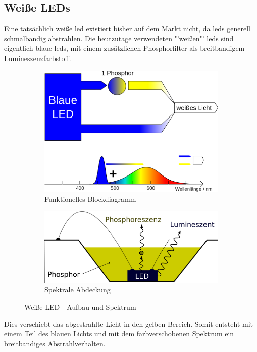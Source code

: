 \documentclass[11pt]{scrartcl}
\begin{document}
\subsection{Weiße LEDs}
Eine tatsächlich weiße \ac{led} existiert bisher auf dem Markt nicht, da \ac{led}s generell schmalbandig abstrahlen. Die heutzutage
verwendeten "'weißen"' \ac{led}s sind eigentlich blaue \ac{led}s, mit einem zusätzlichen Phosphorfilter als breitbandigem Lumineszenzfarbstoff.
\begin{figure}[H]
    \centering
    \begin{subfigure}[b]{0.49\textwidth}
        \includegraphics[width=\textwidth]{images/LED_weiss_P_blau.png}
        \caption{Funktionelles Blockdiagramm}
    \end{subfigure}
    \hfill 
    \begin{subfigure}[b]{0.49\textwidth}
        \includegraphics[width=\textwidth]{images/LED_weiss_phosphor.png}
        \caption{Spektrale Abdeckung}
    \end{subfigure}
    \caption{Weiße LED - Aufbau und Spektrum \cite{wikiLed}}\label{fig:White LED}
\end{figure}
\noindent
Dies verschiebt das abgestrahlte Licht in den gelben Bereich. Somit entsteht mit einem Teil des blauen Lichts und mit dem farbverschobenen Spektrum
ein breitbandiges Abstrahlverhalten.
\clearpage
\end{document}
